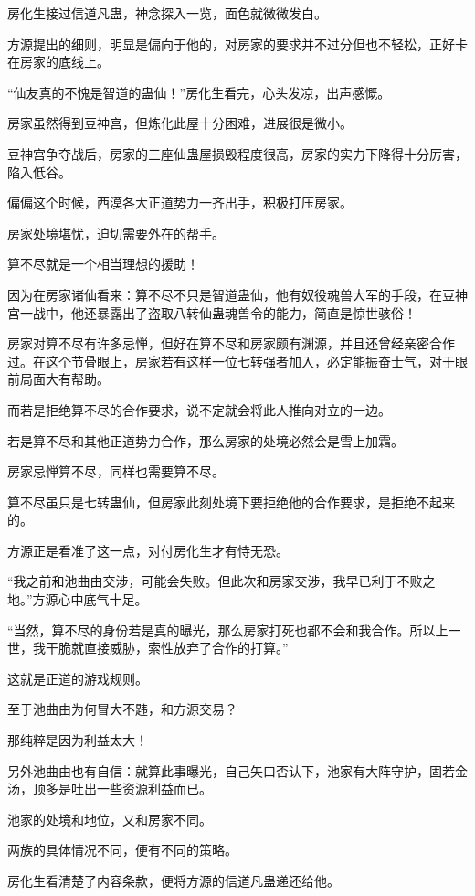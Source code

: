 \begin{this_body}
房化生接过信道凡蛊，神念探入一览，面色就微微发白。

方源提出的细则，明显是偏向于他的，对房家的要求并不过分但也不轻松，正好卡在房家的底线上。

“仙友真的不愧是智道的蛊仙！”房化生看完，心头发凉，出声感慨。

房家虽然得到豆神宫，但炼化此屋十分困难，进展很是微小。

豆神宫争夺战后，房家的三座仙蛊屋损毁程度很高，房家的实力下降得十分厉害，陷入低谷。

偏偏这个时候，西漠各大正道势力一齐出手，积极打压房家。

房家处境堪忧，迫切需要外在的帮手。

算不尽就是一个相当理想的援助！

因为在房家诸仙看来：算不尽不只是智道蛊仙，他有奴役魂兽大军的手段，在豆神宫一战中，他还暴露出了盗取八转仙蛊魂兽令的能力，简直是惊世骇俗！

房家对算不尽有许多忌惮，但好在算不尽和房家颇有渊源，并且还曾经亲密合作过。在这个节骨眼上，房家若有这样一位七转强者加入，必定能振奋士气，对于眼前局面大有帮助。

而若是拒绝算不尽的合作要求，说不定就会将此人推向对立的一边。

若是算不尽和其他正道势力合作，那么房家的处境必然会是雪上加霜。

房家忌惮算不尽，同样也需要算不尽。

算不尽虽只是七转蛊仙，但房家此刻处境下要拒绝他的合作要求，是拒绝不起来的。

方源正是看准了这一点，对付房化生才有恃无恐。

“我之前和池曲由交涉，可能会失败。但此次和房家交涉，我早已利于不败之地。”方源心中底气十足。

“当然，算不尽的身份若是真的曝光，那么房家打死也都不会和我合作。所以上一世，我干脆就直接威胁，索性放弃了合作的打算。”

这就是正道的游戏规则。

至于池曲由为何冒大不韪，和方源交易？

那纯粹是因为利益太大！

另外池曲由也有自信：就算此事曝光，自己矢口否认下，池家有大阵守护，固若金汤，顶多是吐出一些资源利益而已。

池家的处境和地位，又和房家不同。

两族的具体情况不同，便有不同的策略。

房化生看清楚了内容条款，便将方源的信道凡蛊递还给他。


\end{this_body}

